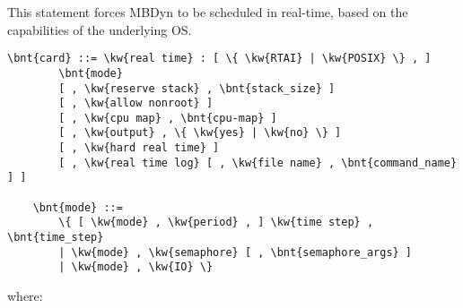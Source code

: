 \noindent
This statement forces MBDyn to be scheduled in real-time,
based on the capabilities of the underlying OS.
\begin{Verbatim}[commandchars=\\\{\}]
    \bnt{card} ::= \kw{real time} : [ \{ \kw{RTAI} | \kw{POSIX} \} , ]
        \bnt{mode}
        [ , \kw{reserve stack} , \bnt{stack_size} ]
        [ , \kw{allow nonroot} ]
        [ , \kw{cpu map} , \bnt{cpu-map} ]
        [ , \kw{output} , \{ \kw{yes} | \kw{no} \} ]
        [ , \kw{hard real time} ]
        [ , \kw{real time log} [ , \kw{file name} , \bnt{command_name} ] ]

    \bnt{mode} ::=
        \{ [ \kw{mode} , \kw{period} , ] \kw{time step} , \bnt{time_step}
        | \kw{mode} , \kw{semaphore} [ , \bnt{semaphore_args} ]
        | \kw{mode} , \kw{IO} \}
\end{Verbatim}
where:
